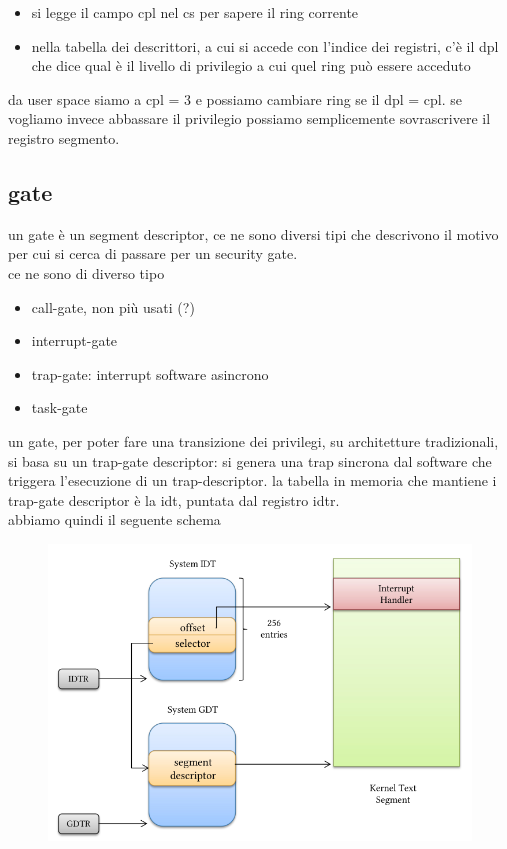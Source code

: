 \documentclass[12pt, oneside]{extbook} %
\begin{document}
\begin{itemize}
\item si legge il campo cpl nel cs per sapere il ring corrente
\item nella tabella dei descrittori, a cui si accede con l'indice dei registri, c'è il dpl che dice qual è il livello di privilegio a cui quel ring può essere acceduto
\end{itemize}
da user space siamo a cpl = 3 e possiamo cambiare ring se il dpl = cpl. se vogliamo invece abbassare il privilegio possiamo semplicemente sovrascrivere il registro segmento.
\subsection{gate}
un gate è un segment descriptor, ce ne sono diversi tipi che descrivono il motivo per cui si cerca di passare per un security gate.\\ce ne sono di diverso tipo
\begin{itemize}
\item call-gate, non più usati (?)
\item interrupt-gate
\item trap-gate: interrupt software asincrono
\item task-gate
\end{itemize}
un gate, per poter fare una transizione dei privilegi, su architetture tradizionali, si basa su un trap-gate descriptor: si genera una trap sincrona dal software che triggera l'esecuzione di un trap-descriptor. la tabella in memoria che mantiene i trap-gate descriptor è la idt, puntata dal registro idtr.\\abbiamo quindi il seguente schema\\
\begin{figure}[!h]
	\includegraphics[scale=0.4]{immagini/idt_gdt.png}
\end{figure}\\\\
\end{document}
